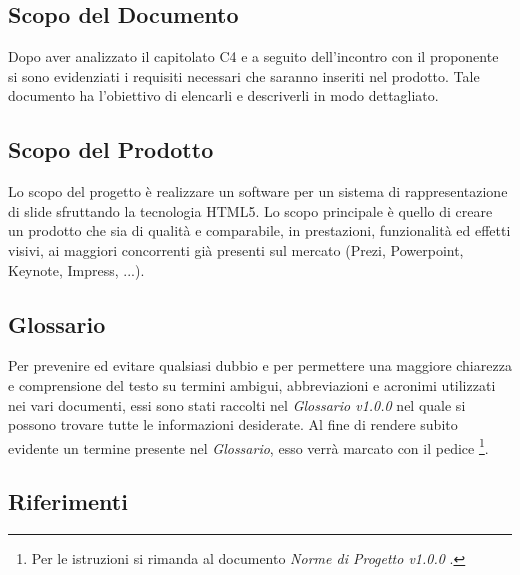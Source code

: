 \subsection{Scopo del Documento}
Dopo aver analizzato il capitolato C4 e a seguito dell'incontro con il proponente si sono evidenziati i requisiti
necessari che saranno inseriti nel prodotto. Tale documento ha l'obiettivo di elencarli e descriverli in modo dettagliato.

\subsection{Scopo del Prodotto}
Lo scopo del progetto è realizzare un software per un sistema di rappresentazione di \gls{slide} sfruttando la tecnologia \gls{HTML5}.
Lo scopo principale è quello di creare un prodotto che sia di qualità e comparabile, in prestazioni, funzionalità ed 
effetti visivi, ai maggiori concorrenti già presenti sul mercato (Prezi, Powerpoint, Keynote, Impress, ...).

\subsection{Glossario}
Per prevenire ed evitare qualsiasi dubbio e per permettere una maggiore chiarezza e comprensione del testo su termini ambigui, abbreviazioni e acronimi utilizzati nei vari documenti, essi sono stati raccolti nel \textit{Glossario v1.0.0} nel quale si possono trovare tutte le informazioni desiderate.
Al fine di rendere subito evidente un termine presente nel \textit{Glossario}, esso verrà marcato con il pedice \G\footnote{Per le istruzioni si rimanda al documento \textit{Norme di Progetto v1.0.0} .}.

\subsection{Riferimenti}
